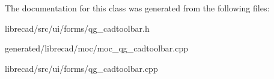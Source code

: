 The documentation for this class was generated from the following files\-:\begin{DoxyCompactItemize}
\item 
librecad/src/ui/forms/qg\-\_\-cadtoolbar.\-h\item 
generated/librecad/moc/moc\-\_\-qg\-\_\-cadtoolbar.\-cpp\item 
librecad/src/ui/forms/qg\-\_\-cadtoolbar.\-cpp\end{DoxyCompactItemize}
